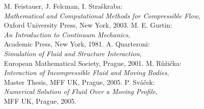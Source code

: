 \begin{thebibliography}{999}
  M. Feistauer, J. Felcman, I. Straškraba: \\
    {\em Mathematical and Computational Methods for Compressible Flow}, \\
    Oxford University Press, New York, 2003.
  M. E. Gurtin: \\
    {\em An Introduction to Continuum Mechanics}, \\
    Academic Press, New York, 1981.
  A. Quarteroni: \\
    {\em Simulation of Fluid and Structure Interaction}, \\
    European Mathematical Society, Prague, 2001.
  M. Růžička: \\
    {\em Interaction of Incompressible Fluid and Moving Bodies}, \\
    Master Thesis, MFF UK, Prague, 2005.
  P. Sváček: \\
    {\em Numerical Solution of Fluid Over a Moving Profile}, \\
    MFF UK, Prague, 2005.
\end{thebibliography}
